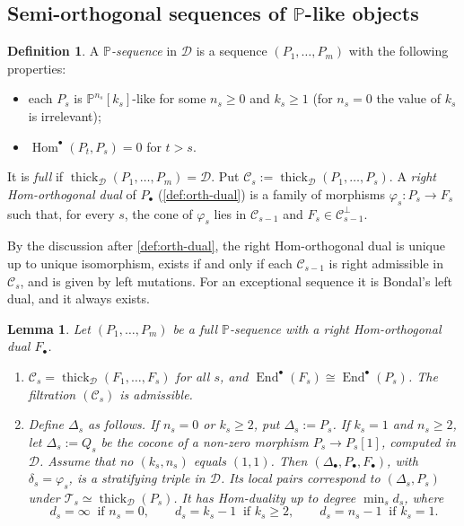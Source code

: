 \documentclass[11pt,reqno]{amsart}
\theoremstyle{plain}
\newtheorem{lemma}[theorem]{Lemma}
\theoremstyle{definition}
\newtheorem{definition}[theorem]{Definition}
\theoremstyle{remark}
\DeclareMathOperator{\Hom}{Hom}
\DeclareMathOperator{\End}{End}
\newcommand{\thick}[2][\cD]{\operatorname{thick}_{#1}(#2)}
\newcommand{\Pn}[2]{\mathbb{P}^{#1}[#2]}
\newcommand{\cD}{\mathcal{D}}
\newcommand{\cT}{\mathcal{T}}
\newcommand{\cC}{\mathcal{C}}
\begin{document}
\subsection{Semi-orthogonal sequences of \texorpdfstring{$\mathbb{P}$}{P}-like objects}\label{sec:P-sequences}

\begin{definition}\label{def:P-sequence}
A \emph{$\mathbb{P}$-sequence} in $\cD$ is a sequence $(P_1,\dots,P_m)$ with the following properties:
\begin{itemize}
\item each $P_s$ is $\Pn{n_s}{k_s}$-like for some $n_s\ge0$ and $k_s\ge1$ (for $n_s=0$ the value of $k_s$ is irrelevant);
\item $\Hom^\bullet(P_t,P_s)=0$ for $t>s$.
\end{itemize}
It is \emph{full} if $\thick{P_1,\dots,P_m}=\cD$. Put $\cC_s:=\thick{P_1,\dots,P_s}$. A \emph{right Hom-orthogonal dual} of $P_\bullet$ (\cref{def:orth-dual}) is a family of morphisms $\varphi_s\colon P_s\to F_s$ such that, for every $s$, the cone of $\varphi_s$ lies in $\cC_{s-1}$ and $F_s\in\cC_{s-1}^\perp$.
\end{definition}

By the discussion after \cref{def:orth-dual}, the right Hom-orthogonal dual is unique up to unique isomorphism, exists if and only if each $\cC_{s-1}$ is right admissible in $\cC_s$, and is given by left mutations. For an exceptional sequence it is Bondal's left dual, and it always exists.

\begin{lemma}\label{lem:P-triple}
Let $(P_1,\dots,P_m)$ be a full $\mathbb{P}$-sequence with a right Hom-orthogonal dual $F_\bullet$.
\begin{enumerate}
\item $\cC_s=\thick{F_1,\dots,F_s}$ for all $s$, and $\End^\bullet(F_s)\cong\End^\bullet(P_s)$. The filtration $(\cC_s)$ is admissible.
\item Define $\Delta_s$ as follows. If $n_s=0$ or $k_s\ge2$, put $\Delta_s:=P_s$. If $k_s=1$ and $n_s\ge2$, let $\Delta_s:=Q_s$ be the cocone of a non-zero morphism $P_s\to P_s[1]$, computed in $\cD$. Assume that no $(k_s,n_s)$ equals $(1,1)$. Then $(\Delta_\bullet,P_\bullet,F_\bullet)$, with $\delta_s=\varphi_s$, is a stratifying triple in $\cD$. Its local pairs correspond to $(\Delta_s,P_s)$ under $\cT_s\simeq\thick{P_s}$. It has Hom-duality up to degree $\min_s d_s$, where
\[d_s=\infty\ \text{ if } n_s=0,\qquad d_s=k_s-1\ \text{ if } k_s\ge2,\qquad d_s=n_s-1\ \text{ if } k_s=1.\]
\end{enumerate}
\end{lemma}
\end{document}
